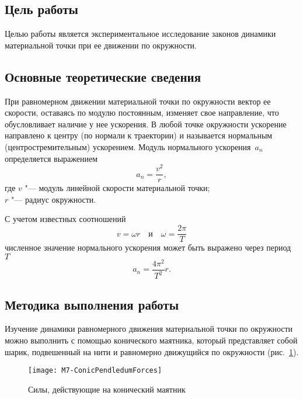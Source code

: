 \documentclass[a4paper, 12pt]{extarticle}
\begin{document}
\MTDTitlePage
\MTDInfoPage

\setcounter{section}{7}

\subsection{Цель работы}
Целью работы является экспериментальное исследование законов динамики  материальной точки при ее движении по окружности. 

\subsection{Основные теоретические сведения}
При равномерном движении материальной точки по окружности вектор ее скорости, оставаясь по модулю постоянным, изменяет свое направление,  что обусловливает наличие у нее ускорения. В любой точке окружности ускорение направлено к центру (по нормали к траектории) и называется нормальным (центростремительным) ускорением. Модуль нормального ускорения~$a_n$ определяется выражением 
\begin{equation}
\label{eq:m7-radial-acc-1}
a_n = \frac{v^2}{r},
\end{equation}
где $v$ "--- модуль линейной скорости материальной точки; \\
$r$ "--- радиус окружности.

С учетом известных соотношений
\begin{equation}
\label{eq:m7-angular-velocity}
v = \omega r \quad \text{и} \quad \omega = \frac{2\pi}{T} %
\end{equation}
численное значение нормального ускорения может быть выражено через период~$T$
\begin{equation}
\label{eq:m7-radial-acc-2}
a_n = \frac{4\pi^2}{T^2}r.
\end{equation}

\subsection{Методика выполнения работы}
Изучение динамики равномерного движения материальной точки по окружности можно выполнить с помощью конического маятника, который представляет собой шарик, подвешенный на нити и равномерно движущийся по окружности (рис.~\ref{fig:m7-conical-pendulum}).

\begin{figure}[h] %
\begin{center}
\texttt{[image: M7-ConicPendledumForces]}
\end{center}
\caption{Силы, действующие на конический маятник \label{fig:m7-conical-pendulum}}
\end{figure}
\end{document}
